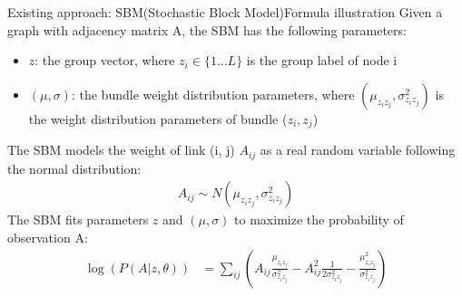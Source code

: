 \documentclass{beamer}
\begin{document}
\begin{frame}{Existing approach: SBM(Stochastic Block Model)}{Formula illustration}
	Given a graph with adjacency matrix A, the SBM has the following parameters:
	\begin{itemize}
		\item $ z $: the group vector,
		where $ z_i \in \{ 1 ... L \} $ is the group label of node i
		\item $ (\mu, \sigma) $: the bundle weight distribution parameters,
		where $ (\mu_{z_i z_j}, \sigma_{z_i z_j}^2) $ is the weight distribution parameters of bundle ($z_i, z_j$)
	\end{itemize}
	The SBM models the weight of link (i, j) $ A_{ij} $ as a real random variable following the normal distribution:
	\begin{align*}
	A_{ij} \sim N(\mu_{z_i z_j}, \sigma_{z_i z_j}^2)
	\end{align*}
	The SBM fits parameters $ z $ and $ (\mu, \sigma) $
	to maximize the probability of observation A:
	\begin{align*}
	\log(P(A|z, \theta))
	&= \sum_{ij} (
	A_{ij} \frac{\mu_{z_i z_j}}{\sigma_{z_i z_j}^2}
	- A_{ij}^2 \frac{1}{2\sigma_{z_i z_j}^2}
	- \frac{\mu_{z_i z_j}^2}{\sigma_{z_i z_j}^2}
	)
	\end{align*}
\end{frame}
\end{document}
